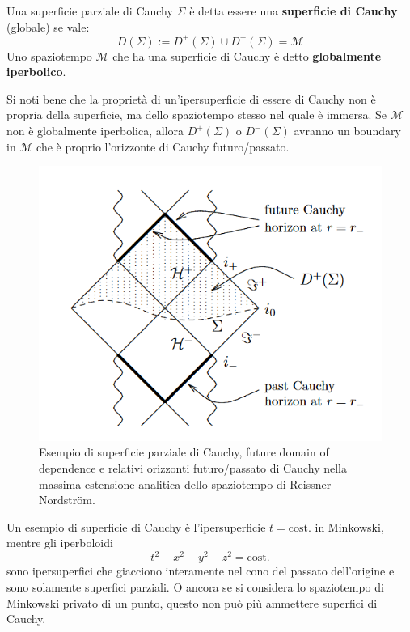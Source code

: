 \begin{definizione}
Una superficie parziale di Cauchy $\Sigma$ è detta essere una \textbf{superficie di Cauchy} (globale) se vale:
\begin{equation*}
    D(\Sigma) := D^+(\Sigma) \cup D^-(\Sigma) = \mathcal{M}
\end{equation*}
Uno spaziotempo $\mathcal{M}$ che ha una superficie di Cauchy è detto \textbf{globalmente iperbolico}.
\end{definizione}
Si noti bene che la proprietà di un'ipersuperficie di essere di Cauchy non è propria della superficie, ma dello spaziotempo stesso nel quale è immersa. Se $\mathcal M$ non è globalmente iperbolica, allora $D^+(\Sigma)$ o $D^-(\Sigma)$ avranno un boundary in $\mathcal{M}$ che è proprio l'orizzonte di Cauchy futuro/passato.
\begin{figure}
    \centering
    \includegraphics[scale=0.5]{immagini/cauchy_horizon.png}
    \caption{Esempio di superficie parziale di Cauchy, future domain of dependence e relativi orizzonti futuro/passato di Cauchy nella massima estensione analitica dello spaziotempo di Reissner-Nordstr\"om.}
    \label{fig.cauchy_horizon}
\end{figure}
Un esempio di superficie di Cauchy è l'ipersuperficie $t=\textrm{cost.}$ in Minkowski, mentre gli iperboloidi
\begin{equation*}
    t^2 - x^2 - y^2 - z^2 = \textrm{cost.}
\end{equation*}
sono ipersuperfici che giacciono interamente nel cono del passato dell'origine e sono solamente superfici parziali. O ancora se si considera lo spaziotempo di Minkowski privato di un punto, questo non può più ammettere superfici di Cauchy.

